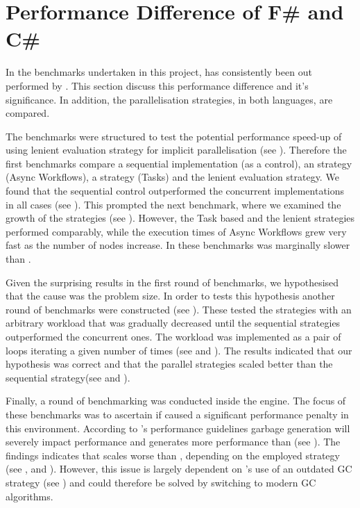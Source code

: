 \section{Performance Difference of F\# and C\#}\label{sec:perf-diff}
In the benchmarks undertaken in this project, \fs has consistently been out performed by \cs. This section discuss this performance difference and it's significance. In addition, the parallelisation strategies, in both languages, are compared.

The benchmarks were structured to test the potential performance speed-up of using lenient evaluation strategy for implicit parallelisation (see ). Therefore the first benchmarks compare a sequential implementation (as a control), an \fs strategy (Async Workflows), a \cs strategy (Tasks) and the lenient evaluation strategy. We found that the sequential control outperformed the concurrent implementations in all cases (see ). This prompted the next benchmark, where we examined the growth of the strategies (see ). However, the Task based and the lenient strategies performed comparably, while the execution times of Async Workflows grew very fast as the number of nodes increase. In these benchmarks \fs was marginally slower than \cs.

Given the surprising results in the first round of benchmarks, we hypothesised that the cause was the problem size. In order to tests this hypothesis another round of benchmarks were constructed (see ). These tested the strategies with an arbitrary workload that was gradually decreased until the sequential strategies outperformed the concurrent ones. The workload was implemented as a pair of  loops iterating a given number of times (see  and ). The results indicated that our hypothesis was correct and that the parallel strategies scaled better than the sequential strategy(see  and ).

Finally, a round of benchmarking was conducted inside the \unity engine. The focus of these benchmarks was to ascertain if \fs caused a significant performance penalty in this environment. According to \unity's performance guidelines garbage generation will severely impact performance and \fs generates more performance than \cs (see )\cite{normark2008mapping, unity:fsharp}. The findings indicates that \fs scales worse than \cs, depending on the employed strategy (see ,  and ). However, this issue is largely dependent on \unity's use of an outdated \gls{GC} strategy (see ) and could therefore be solved by switching to modern \gls{GC} algorithms.

